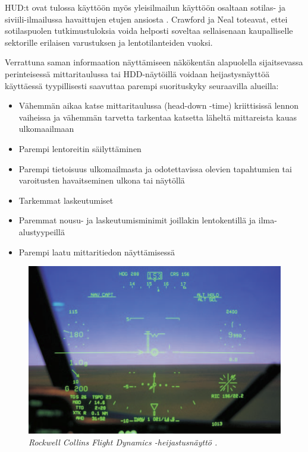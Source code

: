 \documentclass[utf8,bachelor,manualbib]{gradu3}
\begin{document}
HUD:t ovat tulossa käyttöön myös yleisilmailun käyttöön osaltaan sotilas- ja siviili-ilmailussa havaittujen etujen ansiosta \citep{ververswickens1998}. Crawford ja Neal \citeyearpar{crawfordneal2006} toteavat, ettei sotilaspuolen tutkimustuloksia voida helposti soveltaa sellaisenaan kaupalliselle sektorille erilaisen varustuksen ja lentotilanteiden vuoksi.

Verrattuna saman informaation näyttämiseen näkökentän alapuolella sijaitsevassa perinteisessä mittaritaulussa tai HDD-näytöillä voidaan heijastysnäyttöä käyttäessä tyypillisesti saavuttaa parempi suorituskyky seuraavilla alueilla:

\begin{itemize}
\item Vähemmän aikaa katse mittaritaulussa (head-down -time) kriittisissä lennon vaiheissa ja vähemmän tarvetta tarkentaa katsetta läheltä mittareista kauas ulkomaailmaan \citep{maywickens1995}
\item Parempi lentoreitin säilyttäminen \citep{fischerym1980, lauberym1982, wickenslong1995}
\item Parempi tietoisuus ulkomailmasta ja odotettavissa olevien tapahtumien tai varoitusten havaitseminen ulkona tai näytöllä \citep{faddenym2000, fischer1979, larishwickens1991, maywickens1995, wickenslong1995}
\item Tarkemmat laskeutumiset \citep{naish1964}
\item Paremmat nousu- ja laskeutumisminimit joillakin lentokentillä ja ilma-alustyypeillä \citep{crawfordneal2006}
\item Parempi laatu mittaritiedon näyttämisessä \citep{maywickens1995}
\end{itemize}

\begin{figure}[t]
\centering
\includegraphics[width=12cm]{HUD.png}
\caption{\itshape Rockwell Collins Flight Dynamics -heijastusnäyttö \citep{crawfordneal2006}.}
\label{F:HUD}
\end{figure}
\end{document}
